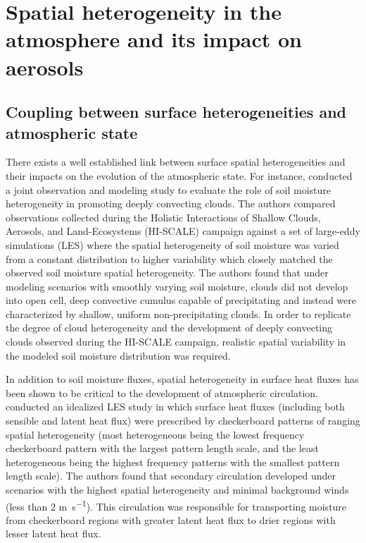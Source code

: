 \section{Spatial heterogeneity in the atmosphere and its impact on aerosols}

\subsection{Coupling between surface heterogeneities and atmospheric state}

There exists a well established link between surface spatial heterogeneities and their impacts on the evolution of the atmospheric state. For instance, \cite{fast_impact_2019} conducted a joint observation and modeling study to evaluate the role of soil moisture heterogeneity in promoting deeply convecting clouds. The authors compared observations collected during the Holistic Interactions of Shallow Clouds, Aerosols, and Land-Ecosystems (HI-SCALE) campaign against a set of large-eddy simulations (LES) where the spatial heterogeneity of soil moisture was varied from a constant distribution to higher variability which closely matched the observed soil moisture spatial heterogeneity.  The authors found that under modeling scenarios with smoothly varying soil moisture, clouds did not develop into open cell, deep convective cumulus capable of precipitating and instead were characterized by shallow, uniform non-precipitating clouds. In order to replicate the degree of cloud heterogeneity and the development of deeply convecting clouds observed during the HI-SCALE campaign, realistic spatial variability in the modeled soil moisture distribution was required. 

In addition to soil moisture fluxes, spatial heterogeneity in surface heat fluxes has been shown to be critical to the development of atmospheric circulation. \cite{lee_effect_2019} conducted an idealized LES study in which surface heat fluxes (including both sensible and latent heat flux) were prescribed by checkerboard patterns of ranging spatial heterogeneity (most heterogeneous being the lowest frequency checkerboard pattern with the largest pattern length scale, and the least heterogeneous being the highest frequency patterns with the smallest pattern length scale). The authors found that secondary circulation developed under scenarios with the highest spatial heterogeneity and minimal background winds (less than 2 \si{m.s^{-1}}). This circulation was responsible for transporting moisture from checkerboard regions with greater latent heat flux to drier regions with lesser latent heat flux. 

